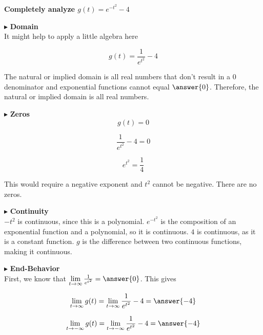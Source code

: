 \documentclass{ximera}
\begin{document}
\begin{example}

\textbf{\textcolor{purple!85!blue}{Completely analyze $g(t) = e^{-t^2} - 4$}}

$\blacktriangleright$  \textbf{\textcolor{blue!55!black}{Domain}} \\


It might help to apply a little algebra here


\[
g(t) = \frac{1}{e^{t^2}} - 4
\]



The natural or implied domain is all real numbers that don't result in a $0$ denominator and exponential functions cannot equal $\answer{0}$.  Therefore, the natural or implied domain is all real numbers.







$\blacktriangleright$  \textbf{\textcolor{blue!55!black}{Zeros}} \\

\[
g(t) = 0
\]



\[
\frac{1}{e^{t^2}} - 4 = 0
\]


\[
e^{t^2} = \frac{1}{4}
\]


This would require a negative exponent and $t^2$ cannot be negative.  There are no zeros.






$\blacktriangleright$  \textbf{\textcolor{blue!55!black}{Continuity}} \\


$-t^2$ is continuous, since this is a polynomial.  $e^{-t^2}$ is the composition of an exponential function and a polynomial, so it is continuous. $4$ is continuous, as it is a constant function. $g$ is the difference between two continuous functions, making it continuous.






$\blacktriangleright$  \textbf{\textcolor{blue!55!black}{End-Behavior}} \\



First, we know that $\lim\limits_{t \to \infty}  \frac{1}{e^{t^2}} = \answer{0}$.  This gives


\[   \lim\limits_{t \to \infty} g(t) =  \lim\limits_{t \to \infty}  \frac{1}{e^{t^2}} - 4 = \answer{-4} \]


\[   \lim\limits_{t \to -\infty} g(t) =  \lim\limits_{t \to -\infty}  \frac{1}{e^{t^2}} - 4 = \answer{-4} \]






\end{example}
\end{document}

